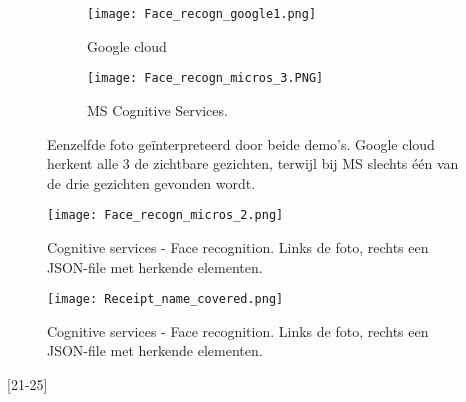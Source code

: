 \begin{figure}[h]
	\centering
	\begin{subfigure}{0.45\textwidth}
		\centering
		\texttt{[image: Face\_recogn\_google1.png]}
		\caption{Google cloud}
		\label{fig:sub1}
	\end{subfigure}%
	\begin{subfigure}{0.45\textwidth}
		\centering
		\texttt{[image: Face\_recogn\_micros\_3.PNG]}
		\caption{MS Cognitive Services.}
		\label{fig:sub2}
	\end{subfigure}
	\caption{Eenzelfde foto geïnterpreteerd door beide demo's. Google cloud herkent alle 3 de zichtbare gezichten, terwijl bij MS slechts één van de drie gezichten gevonden wordt.}
	\label{fig:test}
\end{figure}

\begin{figure}[h]
	\texttt{[image: Face\_recogn\_micros\_2.png]}
	\caption{Cognitive services - Face recognition. Links de foto, rechts een JSON-file met herkende elementen.}
	\label{fig:cognitive2}
\end{figure}

\begin{figure}[h]
	\texttt{[image: Receipt\_name\_covered.png]}
	\caption{Cognitive services - Face recognition. Links de foto, rechts een JSON-file met herkende elementen.}
	\label{fig:receipt}
\end{figure}

[21-25]

